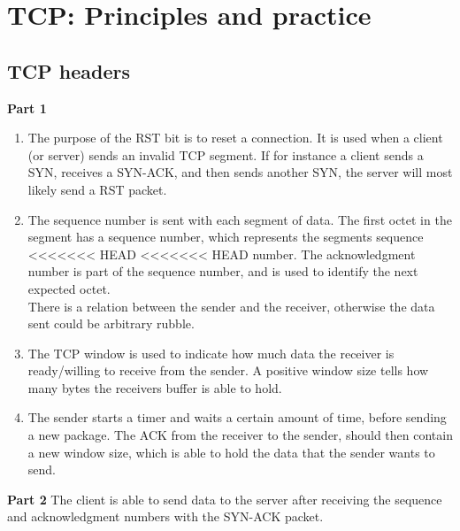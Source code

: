 \section{TCP: Principles and practice}
\subsection{TCP headers}
\textbf{Part 1}\\
\begin{enumerate}
\item The purpose of the RST bit is to reset a connection. It is used
  when a client (or server) sends an invalid TCP segment. If for instance a
  client sends a SYN, receives a SYN-ACK, and then sends another SYN, the server
  will most likely send a RST packet.
\item The sequence number is sent with each segment of data. The first octet in
  the segment has a sequence number, which represents the segments sequence
<<<<<<< HEAD
<<<<<<< HEAD
  number. The acknowledgment number is part of the sequence number, and is used
  to identify the next expected octet.\\
  There is a relation between the sender and the receiver, otherwise the data
  sent could be arbitrary rubble.
\item The TCP window is used to indicate how much data the receiver is
  ready/willing to receive from the sender. A positive window size tells how
  many bytes the receivers buffer is able to hold.
\item The sender starts a timer and waits a certain amount of time, before
  sending a new package. The ACK from the receiver to the sender, should then
  contain a new window size, which is able to hold the data that the sender
  wants to send.
\end{enumerate}

\noindent \textbf{Part 2}
The client is able to send data to the server after receiving the sequence and
acknowledgment numbers with the SYN-ACK packet.\\

